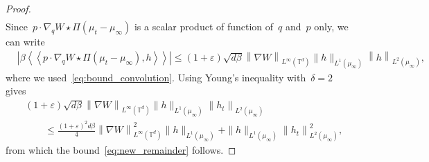 \documentclass[onefignum,onetabnum]{siamart251216} %
\newcommand{\norm}[1]{\left\lVert#1\right\rVert}
\newcommand{\torus}{\mathbb T}
\newcommand{\real}{\mathbb R}
\newcommand{\mc}[1]{\mathcal{#1}}
\renewcommand{\leq}{\leqslant}
\newcommand{\mescin}{\mu}
\newcommand{\normT}[1]{\norm{#1}_{L^\infty(\torus^d)}}
\newcommand{\projp}{\Pi}
\newcommand{\dblangle}[1]{\left\langle\!\left\langle #1 \right\rangle\!\right\rangle}
\newcommand{\norml}[1]{\norm{#1}_{L^2(\mescin_\infty)}}
\newcommand{\eps}{\varepsilon}
\theoremstyle{plain}
\numberwithin{equation}{section}
\numberwithin{theorem}{section}
\begin{document}
\begin{proof}
\begin{align*}
\end{align*}
Since~$p\cdot\nabla_q W \star \projp (\mescin_t - \mescin_\infty)$ is a scalar product of function of~$q$ and~$p$ only, we can write
\begin{align*}
    &\left|\beta\dblangle{ p\cdot\nabla_q W \star \projp (\mescin_t - \mescin_\infty), h}\right|
    \leq (1+\eps)\sqrt{d\beta}\normT{\nabla W}\|h\|_{L^1(\mescin_\infty)}\norml{h},
\end{align*}
where we used~\eqref{eq:bound_convolution}. Using Young's inequality with~$\delta = 2$ gives
\begin{align*}
    &(1+\eps)\sqrt{d\beta}\normT{\nabla W}\|h\|_{L^1(\mescin_\infty)}\norml{h_t} \\
    &\qquad \leq \frac{(1+\eps)^2d\beta}{4}\normT{\nabla W}^2\|h\|_{L^1(\mescin_\infty)} + \|h\|_{L^1(\mescin_\infty)}\norml{h_t}^2,
\end{align*}
from which the bound~\eqref{eq:new_remainder} follows.
\end{proof}
%
%
%
%
\end{document}
